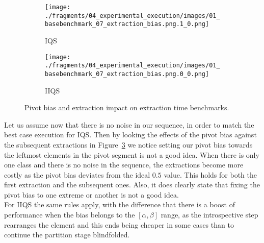 \begin{figure}
    \centering
    \begin{subfigure}[b]{0.45\textwidth}
        \centering
        \texttt{[image: ./fragments/04\_experimental\_execution/images/01\_basebenchmark\_07\_extraction\_bias.png.1\_0.png]}
        \caption{IQS}
        \label{FIG:BENCHMARK_07_NOISE_BIAS__0_0}
    \end{subfigure}
    \hfill
    \begin{subfigure}[b]{0.45\textwidth}
        \centering
        \texttt{[image: ./fragments/04\_experimental\_execution/images/01\_basebenchmark\_07\_extraction\_bias.png.0\_0.png]}
        \caption{IIQS}
        \label{FIG:BENCHMARK_07_NOISE_BIAS__0_1}
    \end{subfigure}

    \caption{Pivot bias and extraction impact on extraction time benchmarks.}
    \label{FIG:BENCHMARK_07_NOISE_BIAS}
\end{figure}


Let us assume now that there is no noise in our sequence, in order to match the best case execution for IQS. Then by looking the effects of the pivot bias against the subsequent extractions in Figure~\ref{FIG:BENCHMARK_07_NOISE_BIAS} we notice setting our pivot bias towards the leftmost elements in the pivot segment is not a good idea. When there is only one class and there is no noise in the sequence, the extractions become more costly as the pivot bias deviates from the ideal $0.5$ value. This holds for both the first extraction and the subsequent ones. Also, it does clearly state that fixing the pivot bias to one extreme or another is not a good idea. \\

For IIQS the same rules apply, with the difference that there is a boost of performance when the bias belongs to the $[\alpha,\beta]$ range, as the introspective step rearranges the element and this ends being cheaper in some cases than to continue the partition stage blindfolded.\\

\FloatBarrier